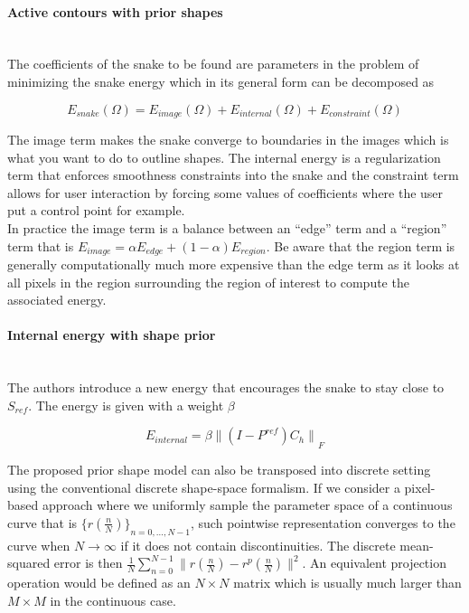 \documentclass[a4paper, 11pt]{article}
\begin{document}
\paragraph{Active contours with prior shapes} \mbox{} \\

The coefficients of the snake to be found are parameters in the problem of minimizing the snake energy which in its 
general form can be decomposed as

\begin{equation}
  E_{snake}(\Omega) = E_{image}(\Omega) + E_{internal}(\Omega) + E_{constraint}(\Omega)
\end{equation}

The image term makes the snake converge to boundaries in the images which is what you want to do to outline shapes. The 
internal energy is a regularization term that enforces smoothness constraints into the snake and the constraint term 
allows for user interaction by forcing some values of coefficients where the user put a control point for example. \\

In practice the image term is a balance between an “edge” term and a “region” term that is $E_{image} = \alpha E_{edge} 
+ (1-\alpha)E_{region}$. Be aware that the region term is generally computationally much more expensive than the edge 
term as it looks at all pixels in the region surrounding the region of interest to compute the associated energy. 

\paragraph{Internal energy with shape prior} \mbox{} \\

The authors introduce a new energy that encourages the snake to stay close to $S_{ref}$. The energy is given with a 
weight $\beta$

\begin{equation}
  E_{internal} = \beta {\|(I-P^{ref})C_h \|}_F
\end{equation}


The proposed prior shape model can also be transposed into discrete setting using the conventional discrete shape-space 
formalism. If we consider a pixel-based approach where we uniformly sample the parameter space of a continuous curve 
that is ${\{r(\frac{n}{N})\}}_{n=0, \ldots, N-1}$, such pointwise representation converges to the curve when $N \to 
\infty$ if it does not contain discontinuities. The discrete mean-squared error is then $\displaystyle \frac{1}{N} 
\sum_{n=0}^{N-1} \| r(\frac{n}{N}) - r^p(\frac{n}{N})\|^2$. An equivalent projection operation would be defined as an 
$N\times N$ matrix which is usually much larger than $M \times M$ in the continuous case. \\
\end{document}
